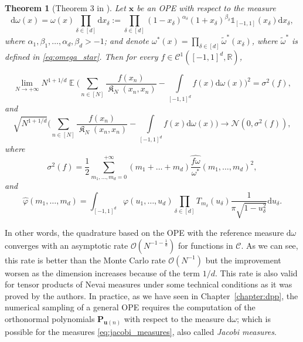 \documentclass[twoside,11pt]{book}
\newtheorem{theorem}{Theorem}
\numberwithin{theorem}{chapter}
\numberwithin{definition}{chapter}
\numberwithin{proposition}{chapter}
\numberwithin{corollary}{chapter}
\numberwithin{example}{chapter}
\numberwithin{lemma}{chapter}
\DeclareMathOperator{\EX}{\mathbb{E}}
\DeclareMathOperator*{\KDPP}{\mathfrak{K}}
\begin{document}
\begin{theorem}[Theorem 3 in \citep{BaHa16}]
Let $\bm{x}$ be an OPE with respect to the measure 
\begin{equation}\label{eq:jacobi_measures}
\mathrm{d}\omega(x) = \omega(x) \prod\limits_{\delta \in [d]} \mathrm{d}x_{\delta} := \prod\limits_{\delta \in [d]} (1-x_{\delta})^{\alpha_{\delta}}(1+x_{\delta})^{\beta_{\delta}} \mathbb{1}_{[-1,1]}(x_{\delta}) \mathrm{d}x_{\delta},
\end{equation}
where $\alpha_{1}, \beta_{1}, \dots, \alpha_{d}, \beta_{d} > -1$; and denote $ \omega^{*}(x) = \prod_{\delta \in [d]} \tilde{\omega}^{*}(x_{\delta})$, where $\tilde{\omega}^{*}$ is defined in \eqref{eq:omega_star}.
Then for every $f \in \mathcal{C}^{1}([-1,1]^{d}, \mathbb{R})$,

\begin{equation}
\lim\limits_{N \rightarrow +\infty} N^{1+1/d} \EX \bigg( \sum_{n \in [N]}\frac{f(x_{n})}{\KDPP_{N}(x_{n},x_{n})} - \int\limits_{[-1,1]^{d}} f(x) \mathrm{d}\omega(x) \bigg)^{2}  =  \sigma^{2}(f),
\end{equation}
and
\begin{equation}
\sqrt{N^{1+1/d}} \bigg( \sum_{n \in [N]}\frac{f(x_{n})}{\KDPP_{N}(x_{n},x_{n})} - \int\limits_{[-1,1]^{d}} f(x) \mathrm{d}\omega(x) \bigg) \rightarrow \mathcal{N}(0,\sigma^{2}(f)),
\end{equation}
where
\begin{equation}
\sigma^{2}(f) = \frac{1}{2} \sum\limits_{m_{1}, \dots , m_{d} = 0}^{+\infty} (m_{1}+\dots +m_{d}) \widehat{\frac{f \omega}{\omega^{*}}} (m_{1}, \dots, m_{d})^{2},
\end{equation}
and 
\begin{equation}
\hat{\varphi}(m_{1},\dots,m_{d}) = \int_{[-1,1]^{d}} \varphi(u_{1}, \dots, u_{d}) \prod\limits_{\delta \in [d]} T_{m_{\delta}}(u_{\delta}) \frac{1}{\pi \sqrt{1-u_{\delta}^{2}}} \mathrm{d}u_{\delta}.
\end{equation}

\end{theorem}

In other words, the quadrature based on the OPE with the reference measure $\mathrm{d}\omega$ converges with an asymptotic rate $\mathcal{O}(N^{-1-\frac{1}{d}})$ for functions in $\mathcal{C}$. 
 As we can see, this rate is better than the Monte Carlo rate $\mathcal{O}(N^{-1})$ but the improvement worsen as the dimension increases because of the term $1/d$. This rate is also valid for tensor products of Nevai measures under some technical conditions as it was proved by the authors. In practice, as we have seen in Chapter~\ref{chapter:dpp}, the numerical sampling of a general OPE requires the computation of the orthonormal polynomials $\bm{P}_{\bm{u}(n)}$ with respect to the measure $\mathrm{d}\omega$; which is possible for the measures \eqref{eq:jacobi_measures}, also called \emph{Jacobi measures}. 
\end{document}
